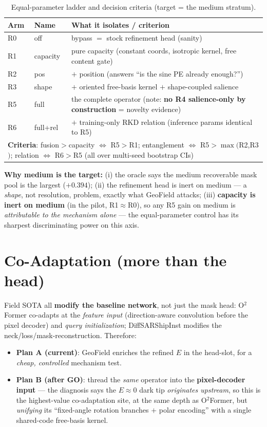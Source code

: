 \documentclass[11pt,a4paper]{article}
\newcommand{\good}[1]{\textcolor{good}{#1}}
\begin{document}
\begin{table}[h]\centering\small
\caption{Equal-parameter ladder and decision criteria (target = the medium stratum).}
\label{tab:ladder}
\begin{tabular}{llp{6.6cm}}
\toprule
Arm & Name & What it isolates / criterion \\
\midrule
R0 & off & bypass $=$ stock refinement head (sanity) \\
R1 & capacity & pure capacity (constant coords, isotropic kernel, free content gate)\\
R2 & pos & $+$ position (answers ``is the sine PE already enough?'')\\
R3 & shape & $+$ oriented free-basis kernel $+$ shape-coupled salience \\
R5 & full & the complete operator (note: \textbf{no R4 salience-only by construction} = novelty evidence)\\
R6 & full+rel & $+$ training-only RKD relation (inference params identical to R5)\\
\midrule
\multicolumn{3}{l}{\textbf{Criteria}: \good{fusion$>$capacity $\Leftrightarrow$ R5$>$R1}; \;\good{entanglement $\Leftrightarrow$ R5$>\max($R2,R3$)$}; \;\good{relation $\Leftrightarrow$ R6$>$R5} (all over multi-seed bootstrap CIs)}\\
\bottomrule
\end{tabular}
\end{table}

\noindent\textbf{Why medium is the target:} (i) the oracle says the medium recoverable mask pool is the
largest ($+0.394$); (ii) the refinement head is inert on medium --- a \emph{shape}, not resolution,
problem, exactly what GeoField attacks; (iii) \textbf{capacity is inert on medium} (in the pilot,
R1$\approx$R0), so any R5 gain on medium is \emph{attributable to the mechanism alone} --- the
equal-parameter control has its sharpest discriminating power on this axis.

\section{Co-Adaptation (more than the head)}
Field SOTA all \textbf{modify the baseline network}, not just the mask head: O$^2$Former co-adapts at
the \emph{feature input} (direction-aware convolution before the pixel decoder) and \emph{query
initialization}; DiffSARShipInst modifies the neck/loss/mask-reconstruction. Therefore:
\begin{itemize}[leftmargin=1.2em,itemsep=2pt]
\item \textbf{Plan A (current)}: GeoField enriches the refined $E$ in the head-slot, for a
\emph{cheap, controlled} mechanism test.
\item \textbf{Plan B (after GO)}: thread the \emph{same} operator into the \textbf{pixel-decoder input}
--- the diagnosis says the $E\!\approx\!0$ dark tip \emph{originates upstream}, so this is the
highest-value co-adaptation site, at the same depth as O$^2$Former, but \emph{unifying} its
``fixed-angle rotation branches $+$ polar encoding'' with a single shared-code free-basis kernel.
\end{itemize}
\end{document}
